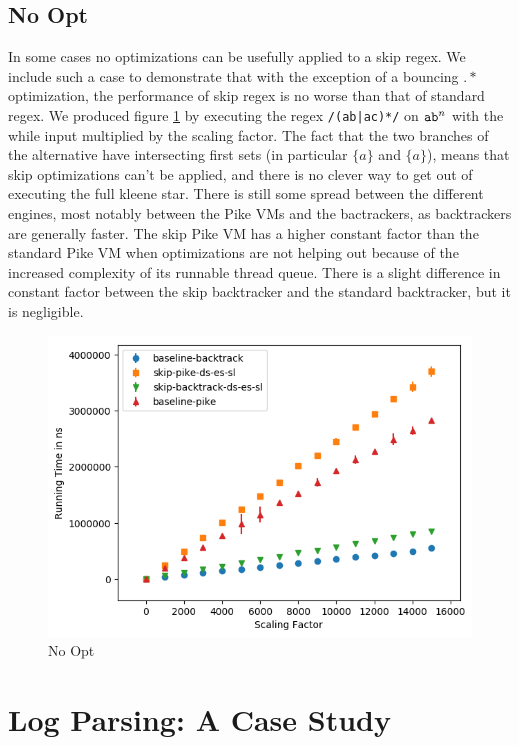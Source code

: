 \subsection{No Opt}

In some cases no optimizations can be usefully applied to a skip
regex. We include such a case to demonstrate that with the exception
of a bouncing $.*$ optimization, the performance of skip regex is
no worse than that of standard regex. We produced figure 
\ref{fig:justtwo:branch}
by executing the regex \verb'/(ab|ac)*/' on ${\tt ab}^n$ with
the while input multiplied by the scaling factor. The fact that the
two branches of the alternative have intersecting first sets
(in particular $\{a\}$ and $\{a\}$), means that skip optimizations
can't be applied, and there is no clever way to get out of
executing the full kleene star. There is still some spread between
the different engines, most notably between the Pike VMs and the
bactrackers, as backtrackers are generally faster. The skip Pike VM
has a higher constant factor than the standard Pike VM when optimizations
are not helping out because of the increased complexity of its runnable
thread queue. There is a slight difference in constant factor between
the skip backtracker and the standard backtracker, but it is negligible.

\begin{figure}
\caption{No Opt}
\label{fig:justtwo:branch}

\includegraphics{resources/justtwo-branch.png}
\end{figure}

\section{Log Parsing: A Case Study}
\label{section:logparsingcase}

